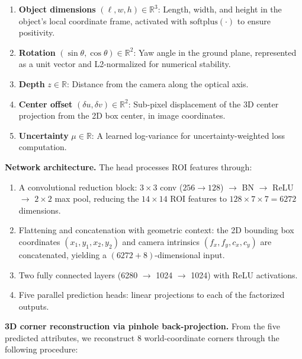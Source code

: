 \documentclass[runningheads]{llncs}
\begin{document}
\begin{enumerate}
    \item \textbf{Object dimensions} $(\ell, w, h) \in \mathbb{R}^3$: Length, width, and height in the object's local coordinate frame, activated with $\text{softplus}(\cdot)$ to ensure positivity.
    \item \textbf{Rotation} $(\sin\theta, \cos\theta) \in \mathbb{R}^2$: Yaw angle in the ground plane, represented as a unit vector and L2-normalized for numerical stability.
    \item \textbf{Depth} $z \in \mathbb{R}$: Distance from the camera along the optical axis.
    \item \textbf{Center offset} $(\delta u, \delta v) \in \mathbb{R}^2$: Sub-pixel displacement of the 3D center projection from the 2D box center, in image coordinates.
    \item \textbf{Uncertainty} $\mu \in \mathbb{R}$: A learned log-variance for uncertainty-weighted loss computation.
\end{enumerate}

\noindent\textbf{Network architecture.}
The head processes ROI features through:
\begin{enumerate}
    \item A convolutional reduction block: $3\times3$ conv ($256 \to 128$) $\to$ BN $\to$ ReLU $\to$ $2\times2$ max pool, reducing the $14\times14$ ROI features to $128\times7\times7 = 6272$ dimensions.
    \item Flattening and concatenation with geometric context: the 2D bounding box coordinates $(x_1, y_1, x_2, y_2)$ and camera intrinsics $(f_x, f_y, c_x, c_y)$ are concatenated, yielding a $(6272 + 8)$-dimensional input.
    \item Two fully connected layers (6280 $\to$ 1024 $\to$ 1024) with ReLU activations.
    \item Five parallel prediction heads: linear projections to each of the factorized outputs.
\end{enumerate}

\noindent\textbf{3D corner reconstruction via pinhole back-projection.}
From the five predicted attributes, we reconstruct 8 world-coordinate corners through the following procedure:
\end{document}
